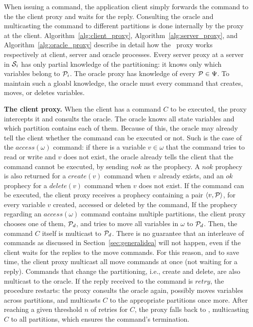 
When issuing a command, the application client simply forwards the command to the the client proxy and waits for the reply.
Consulting the oracle and multicasting the command to different partitions is done internally by the proxy at the client.
Algorithm~\ref{alg:client_proxy}, Algorithm~\ref{alg:server_proxy}, and Algorithm~\ref{alg:oracle_proxy} describe in detail how the \dssmr\ proxy works respectively at client, server and oracle processes.
Every server proxy at a server in $\mathcal{S}_i$ has only partial knowledge of the partitioning: it knows only which variables belong to $\mathcal{P}_i$.
The oracle proxy has knowledge of every $\mathcal{P} \in \Psi$.
To maintain such a gloabl knowledge, the oracle must \amdel{} every command that creates, moves, or deletes variables.



\textbf{The client proxy.} When the client has a command $C$ to be executed, the proxy intercepts it and consults the oracle.
The oracle knows all state variables and which partition contains each of them.
Because of this, the oracle may already tell the client whether the command can be executed or not.
Such is the case of the $access(\omega)$ command: if there is a variable $v \in \omega$ that the command tries to read or write and $v$ does not exist, the oracle already tells the client that the command cannot be executed, by sending $nok$ as the prophecy.
A $nok$ prophecy is also returned for a $create(v)$ command when $v$ already exists, and an $ok$ prophecy for a $delete(v)$ command when $v$ does not exist.
If the command can be executed, the client proxy receives a prophecy containing a pair $\langle v, \mathcal{P} \rangle$, for every variable $v$ created, accessed or deleted by the command, 
If the prophecy regarding an $access(\omega)$ command contains multiple partitions, the client proxy chooses one of them, $\mathcal{P}_d$, and tries to move all variables in $\omega$ to $\mathcal{P}_d$.
Then, the command $C$ itself is multicast to $\mathcal{P}_d$.
There is no guarantee that an interleave of commands as discussed in Section~\ref{sec:generalidea} will not happen, even if the client waits for the replies to the move commands.
For this reason, and to save time, the client proxy multicast all move commands at once (not waiting for a reply).
Commands that change the partitioning, i.e., create and delete, are also multicast to the oracle.
If the reply received to the command is $retry$, the procedure restarts: the proxy consults the oracle again, possibly moves variables across partitions, and multicasts $C$ to the appropriate partitions once more.
After reaching a given threshold $n$ of retries for $C$, the proxy falls back to \ssmr{}, multicasting $C$ to all partitions, which ensures the command's termination.

